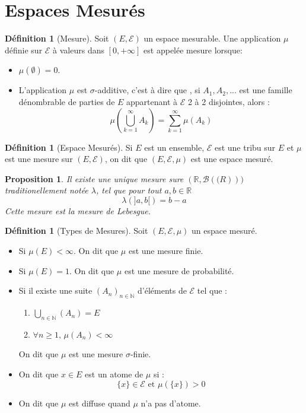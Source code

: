 \documentclass{article}[11pt]
\newtheorem{proposition}[theorem]{Proposition}
\theoremstyle{definition}
\newtheorem{definition}[theorem]{Définition}
\begin{document}
\section{Espaces Mesurés}
\begin{definition}[Mesure]\label{def_mesure}
  Soit $(E,\mathcal{E})$ un espace mesurable. Une application $\mu$ définie sur $\mathcal{E}$ à valeurs dans $[0,+\infty]$ est appelée mesure lorsque: 
 \begin{itemize}
  \item $\mu(\emptyset) = 0$.
  \item L'application $\mu$ est $\sigma$-additive, c'est à dire que , si $A_1,A_2,...$ est une famille dénombrable de parties de $E$ appartenant à $\mathcal{E}$ 2 à 2 disjointes, alors :
    $$\mu(\bigcup_{k=1}^{\infty}A_k) = \sum_{k=1}^{\infty}\mu(A_k)$$
 \end{itemize} 
\end{definition}
\begin{definition}[Espace Mesurés]\label{def_espace_mesuré}
  Si $E$ est un ensemble, $\mathcal{E}$ est une tribu sur $E$ et $\mu$ est une mesure sur $(E,\mathcal{E})$, on dit que $(E,\mathcal{E},\mu)$ est une espace mesuré.
\end{definition}
\begin{proposition}
  Il existe une unique mesure sure $(\mathbb{R}, \mathcal{B}(\mathbb(R)))$ traditionellement notée $\lambda$, tel que pour tout $a,b \in \mathbb{R}$
  $$\lambda(]a,b[) = b -a $$
  Cette mesure est la mesure de Lebesgue.
\end{proposition}
\begin{definition}[Types de Mesures]
  Soit $(E,\mathcal{E},\mu)$ un espace mesuré.
  \begin{itemize}
    \item Si $\mu(E) < \infty$. On dit que $\mu$ est une mesure finie.
    \item Si $\mu(E) = 1$. On dit que $\mu$ est une mesure de probabilité.
    \item Si il existe une suite $(A_n)_{n \in \mathbb{N}}$ d'éléments de $\mathcal{E}$ tel que :
      \begin{enumerate}
        \item $\displaystyle\bigcup_{n \in \mathbb{N}}(A_n) = E$
        \item $\forall n \geq 1\text{, } \mu(A_n) < \infty$
      \end{enumerate}
      On dit que $\mu$ est une mesure $\sigma$-finie.
    \item On dit que $x \in E $ est un atome de $\mu$ si :
      $$ \{x\} \in \mathcal{E} \text{ et } \mu(\{x\}) > 0$$
    \item On dit que $\mu$ est diffuse quand $\mu$ n'a pas d'atome.
  \end{itemize}
\end{definition}
\end{document}
